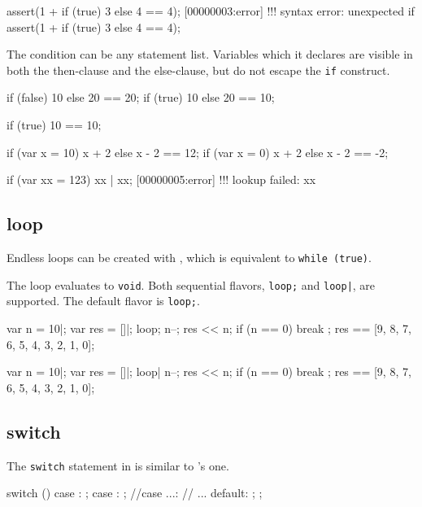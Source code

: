 \begin{urbiscript}
assert(1 + if (true) 3 else 4 == 4);
[00000003:error] !!! syntax error: unexpected if
assert(1 + { if (true) 3 else 4 } == 4);
\end{urbiscript}

The condition can be any statement list.  Variables which it declares are
visible in both the then-clause and the else-clause, but do not escape the
\lstinline|if| construct.

\begin{urbiassert}
{if (false) 10 else 20} == 20;
{if (true)  10 else 20} == 10;

{if (true) 10         } == 10;

{if (var x = 10) x + 2 else x - 2} == 12;
{if (var x = 0)  x + 2 else x - 2} == -2;

{if (var xx = 123) xx | xx};
[00000005:error] !!! lookup failed: xx
\end{urbiassert}


\subsection{loop}
\label{sec:lang:loop}

Endless loops can be created with , which is equivalent to
\lstinline|while (true)|.


The loop evaluates to \lstinline|void|.  Both sequential flavors,
\lstinline|loop;| and \lstinline'loop|', are supported.  The default flavor
is \lstinline|loop;|.

\begin{urbiassert}
{
  var n = 10|;
  var res = []|;
  loop;
  {
    n--;
    res << n;
    if (n == 0)
      break
  };
  res
}
==
[9, 8, 7, 6, 5, 4, 3, 2, 1, 0];
\end{urbiassert}

\begin{urbiassert}
{
  var n = 10|;
  var res = []|;
  loop|
  {
    n--;
    res << n;
    if (n == 0)
      break
  };
  res
}
==
[9, 8, 7, 6, 5, 4, 3, 2, 1, 0];
\end{urbiassert}

\subsection{switch}
\label{sec:lang:switch}
The \lstinline|switch| statement in \us is similar to \langC's one.

\begin{urbiunchecked}
switch ()
{
  case :
    ;
  case :
    ;
//case ...:
//  ...
  default:
    ;
};
\end{urbiunchecked}

